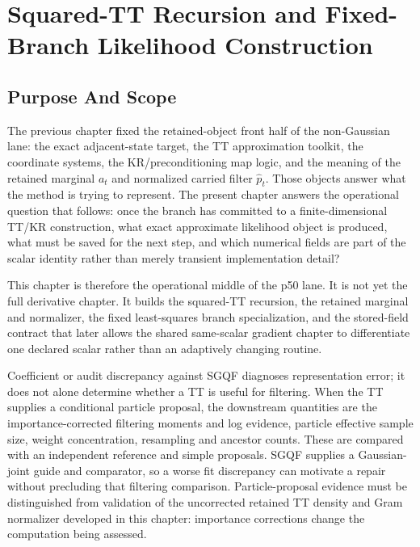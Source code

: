 \chapter{Squared-TT Recursion and Fixed-Branch Likelihood Construction}
\label{ch:bf-highdim-squared-tt-fixed-branch-likelihoods}

\section{Purpose And Scope}
\label{sec:bf-hd-squared-tt-purpose}

The previous chapter fixed the retained-object front half of the non-Gaussian
lane: the exact adjacent-state target, the TT approximation toolkit, the
coordinate systems, the KR/preconditioning map logic, and the meaning of the
retained marginal \(a_t\) and normalized carried filter \(\widehat p_t\).
Those objects answer what the method is trying to represent.  The present chapter
answers the operational question that follows: once the branch has committed to a
finite-dimensional TT/KR construction, what exact approximate likelihood object
is produced, what must be saved for the next step, and which numerical fields are
part of the scalar identity rather than merely transient implementation detail?

This chapter is therefore the operational middle of the p50 lane.  It is not yet
the full derivative chapter.  It builds the squared-TT recursion, the retained
marginal and normalizer, the fixed least-squares branch specialization, and the
stored-field contract that later allows the shared same-scalar gradient chapter
to differentiate one declared scalar rather than an adaptively changing routine.

Coefficient or audit discrepancy against SGQF diagnoses representation error;
it does not alone determine whether a TT is useful for filtering.  When the TT
supplies a conditional particle proposal, the downstream quantities are the
importance-corrected filtering moments and log evidence, particle effective
sample size, weight concentration, resampling and ancestor counts.  These are
compared with an independent reference and simple proposals.  SGQF supplies a
Gaussian-joint guide and comparator, so a worse fit discrepancy can motivate a
repair without precluding that filtering comparison.  Particle-proposal
evidence must be distinguished from validation of the uncorrected retained TT
density and Gram normalizer developed in this chapter: importance corrections
change the computation being assessed.

